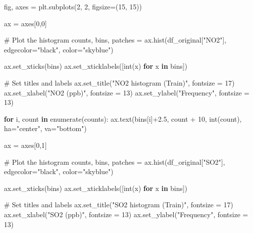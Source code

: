 \documentclass[
  letterpaper,
  DIV=11,
  numbers=noendperiod]{scrartcl}
\newenvironment{Shaded}{\begin{snugshade}}{\end{snugshade}}
\newcommand{\BuiltInTok}[1]{\textcolor[rgb]{0.00,0.23,0.31}{#1}}
\newcommand{\CommentTok}[1]{\textcolor[rgb]{0.37,0.37,0.37}{#1}}
\newcommand{\ControlFlowTok}[1]{\textcolor[rgb]{0.00,0.23,0.31}{\textbf{#1}}}
\newcommand{\DecValTok}[1]{\textcolor[rgb]{0.68,0.00,0.00}{#1}}
\newcommand{\FloatTok}[1]{\textcolor[rgb]{0.68,0.00,0.00}{#1}}
\newcommand{\KeywordTok}[1]{\textcolor[rgb]{0.00,0.23,0.31}{\textbf{#1}}}
\newcommand{\NormalTok}[1]{\textcolor[rgb]{0.00,0.23,0.31}{#1}}
\newcommand{\OperatorTok}[1]{\textcolor[rgb]{0.37,0.37,0.37}{#1}}
\newcommand{\StringTok}[1]{\textcolor[rgb]{0.13,0.47,0.30}{#1}}
\begin{document}
\begin{Shaded}
\begin{Highlighting}[]
\NormalTok{fig, axes }\OperatorTok{=}\NormalTok{ plt.subplots(}\DecValTok{2}\NormalTok{, }\DecValTok{2}\NormalTok{, figsize}\OperatorTok{=}\NormalTok{(}\DecValTok{15}\NormalTok{, }\DecValTok{15}\NormalTok{))}

\NormalTok{ax }\OperatorTok{=}\NormalTok{ axes[}\DecValTok{0}\NormalTok{,}\DecValTok{0}\NormalTok{]}

\CommentTok{\# Plot the histogram}
\NormalTok{counts, bins, patches }\OperatorTok{=}\NormalTok{ ax.hist(df\_original[}\StringTok{"NO2"}\NormalTok{], edgecolor}\OperatorTok{=}\StringTok{"black"}\NormalTok{, color}\OperatorTok{=}\StringTok{"skyblue"}\NormalTok{)}

\NormalTok{ax.set\_xticks(bins) }
\NormalTok{ax.set\_xticklabels([}\BuiltInTok{int}\NormalTok{(x) }\ControlFlowTok{for}\NormalTok{ x }\KeywordTok{in}\NormalTok{ bins])}

\CommentTok{\# Set titles and labels}
\NormalTok{ax.set\_title(}\StringTok{"NO2 histogram (Train)"}\NormalTok{, fontsize }\OperatorTok{=} \DecValTok{17}\NormalTok{)}
\NormalTok{ax.set\_xlabel(}\StringTok{"NO2 (ppb)"}\NormalTok{, fontsize }\OperatorTok{=} \DecValTok{13}\NormalTok{)}
\NormalTok{ax.set\_ylabel(}\StringTok{"Frequency"}\NormalTok{, fontsize }\OperatorTok{=} \DecValTok{13}\NormalTok{)}

\ControlFlowTok{for}\NormalTok{ i, count }\KeywordTok{in} \BuiltInTok{enumerate}\NormalTok{(counts):}
\NormalTok{    ax.text(bins[i]}\OperatorTok{+}\FloatTok{2.5}\NormalTok{, count }\OperatorTok{+} \DecValTok{10}\NormalTok{, }\BuiltInTok{int}\NormalTok{(count), ha}\OperatorTok{=}\StringTok{"center"}\NormalTok{, va}\OperatorTok{=}\StringTok{"bottom"}\NormalTok{)}

\NormalTok{ax }\OperatorTok{=}\NormalTok{ axes[}\DecValTok{0}\NormalTok{,}\DecValTok{1}\NormalTok{]}

\CommentTok{\# Plot the histogram}
\NormalTok{counts, bins, patches }\OperatorTok{=}\NormalTok{ ax.hist(df\_original[}\StringTok{"SO2"}\NormalTok{], edgecolor}\OperatorTok{=}\StringTok{"black"}\NormalTok{, color}\OperatorTok{=}\StringTok{"skyblue"}\NormalTok{)}

\NormalTok{ax.set\_xticks(bins) }
\NormalTok{ax.set\_xticklabels([}\BuiltInTok{int}\NormalTok{(x) }\ControlFlowTok{for}\NormalTok{ x }\KeywordTok{in}\NormalTok{ bins])}

\CommentTok{\# Set titles and labels}
\NormalTok{ax.set\_title(}\StringTok{"SO2 histogram (Train)"}\NormalTok{, fontsize }\OperatorTok{=} \DecValTok{17}\NormalTok{)}
\NormalTok{ax.set\_xlabel(}\StringTok{"SO2 (ppb)"}\NormalTok{, fontsize }\OperatorTok{=} \DecValTok{13}\NormalTok{)}
\NormalTok{ax.set\_ylabel(}\StringTok{"Frequency"}\NormalTok{, fontsize }\OperatorTok{=} \DecValTok{13}\NormalTok{)}


\end{Highlighting}
\end{Shaded}
\end{document}
